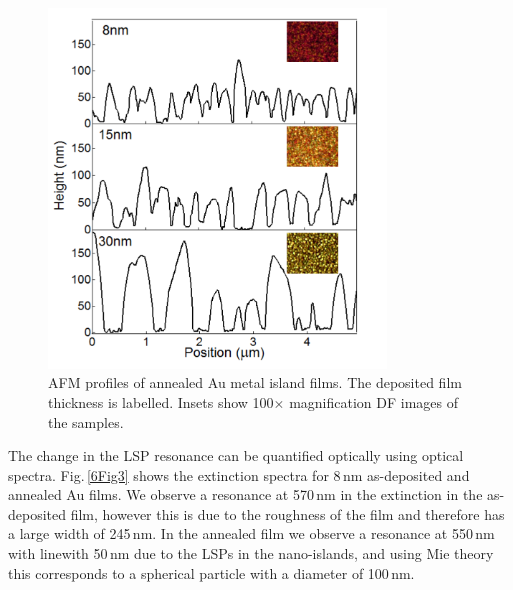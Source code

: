 \begin{figure}[ht] 
\centering    
\includegraphics[width=0.8\textwidth]{Fig2}
\caption{AFM profiles of annealed Au metal island films. The deposited film thickness is labelled. Insets show 100$\times$ magnification DF images of the samples.}
\label{6Fig2}
\end{figure}
The change in the LSP resonance can be quantified optically using optical spectra. Fig.\,\ref{6Fig3} shows the extinction spectra for 8\,nm as-deposited and annealed Au films. We observe a resonance at 570\,nm in the extinction in the as-deposited film, however this is due to the roughness of the film and therefore has a large width of 245\,nm. In the annealed film we observe a resonance at 550\,nm with linewith 50\,nm due to the LSPs in the nano-islands, and using Mie theory this corresponds to a spherical particle with a diameter of 100\,nm.
